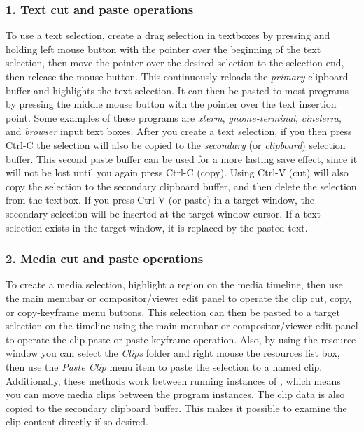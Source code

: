 \subsubsection*{1. Text cut and paste operations}%
\label{ssub:text_cut_paste_operations}

To use a text selection, create a drag selection in textboxes by pressing and holding left mouse button with the pointer over the beginning of the text selection, then move the pointer over the desired selection to the selection end, then release the mouse button.  This continuously reloads the \textit{primary} clipboard buffer and highlights the text selection.  It can then be pasted to most programs by pressing the middle mouse button with the pointer over the text insertion point.  Some examples of these programs are \textit{xterm}, \textit{gnome-terminal}, \textit{cinelerra}, and \textit{browser} input text boxes.  After you create a text selection, if you then press Ctrl-C the selection will also be copied to the \textit{secondary} (or \textit{clipboard}) selection buffer.  This second paste buffer can be used for a more lasting save effect, since it will not be lost until you again press Ctrl-C (copy).  Using Ctrl-V (cut) will also copy the selection to the secondary clipboard buffer, and then delete the selection from the textbox.  If you press Ctrl-V (or paste) in a target window, the secondary selection will be inserted at the target window cursor.  If a text selection exists in the target window, it is replaced by the pasted text.

\subsubsection*{2. Media cut and paste operations}%
\label{ssub:media_cut_paste_operations}

To create a media selection, highlight a region on the \CGG{} media timeline, then use the main menubar or compositor/viewer edit panel to operate the clip cut, copy, or copy-keyframe menu buttons.  This selection can then be pasted to a target selection on the timeline using the main menubar or compositor/viewer edit panel to operate the clip paste or paste-keyframe operation.  Also, by using the resource window you can select the \textit{Clips} folder and right mouse the resources list box, then use the \textit{Paste Clip} menu item to paste the selection to a named clip.  Additionally, these methods work between running instances of \CGG{}, which means you can move media clips between the \CGG{} program instances.  The clip data is also copied to the secondary clipboard buffer.  This makes it possible to examine the clip content directly if so desired.

